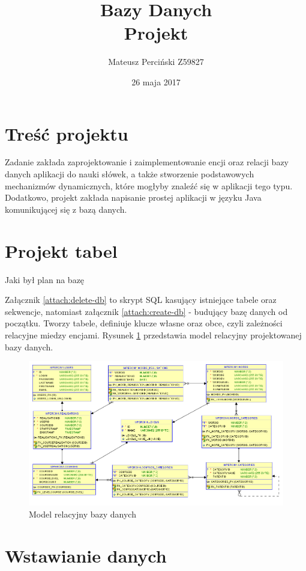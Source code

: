 \documentclass[11pt,a4paper]{article}
\title{Bazy Danych\\\large \medskip Projekt\\}
\author{Mateusz Perciński Z59827}
\date{26 maja 2017}
\begin{document}
\maketitle
\tableofcontents

\section*{Treść projektu}
Zadanie zakłada zaprojektowanie i zaimplementowanie encji oraz relacji bazy danych aplikacji do nauki słówek, a także stworzenie podstawowych mechanizmów dynamicznych, które mogłyby znaleźć się w aplikacji tego typu. Dodatkowo, projekt zakłada napisanie prostej aplikacji w języku Java komunikującej się z bazą danych. 

\section{Projekt tabel}
Jaki był plan na bazę %

Załącznik \ref{attach:delete-db} to skrypt SQL kasujący istniejące tabele oraz sekwencje, natomiast załącznik \ref{attach:create-db} - budujący bazę danych od początku. Tworzy tabele, definiuje klucze własne oraz obce, czyli zależności relacyjne miedzy encjami. Rysunek \ref{fig:model} przedstawia model relacyjny projektowanej bazy danych.

\begin{figure}[ht!]
\includegraphics[width=\textwidth]{graphics/relational-model}
\caption{Model relacyjny bazy danych}
\label{fig:model}
\end{figure}

\section{Wstawianie danych}
\end{document}
